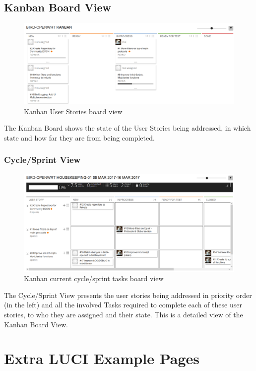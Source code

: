 \begin{appendices}
\begin{landscape}
\section{Kanban Board View}
\begin{figure}[ht!]
\centering
    \includegraphics[width=0.85\hsize]{images/kanban/kanban}
    \caption{Kanban User Stories board view}
    \label{fig:kboard}
\end{figure}
The Kanban Board shows the state of the User Stories being addressed, in which state and how far they are from being completed.
\newpage

\subsection{Cycle/Sprint View}
\begin{figure}[ht!]
\centering
    \includegraphics[width=0.85\hsize]{images/kanban/cycle}
    \caption{Kanban current cycle/sprint tasks board view}
    \label{fig:kcycle}
\end{figure}
The Cycle/Sprint View presents the user stories being addressed in priority order (in the left) and all the involved Tasks required to complete each of these user stories, to who they are assigned and their state. This is a detailed view of the Kanban Board View.

\end{landscape}

\chapter{Extra LUCI Example Pages}
\label{app:ch:extrap}


\end{appendices}

